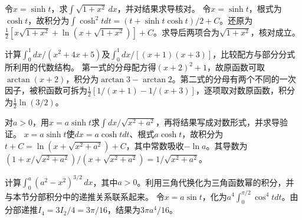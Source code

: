 令\(x=\sinh t\)，求\(\int\sqrt{1+x^2}\,dx\)，并对结果求导核对。
\solutionanswer
令\(x=\sinh t\)，根式为\(\cosh t\)，故积分为\(\int\cosh^2t dt=(t+\sinh t\cosh t)/2+C\)。还原为\(\frac12[x\sqrt{1+x^2}+\ln(x+\sqrt{1+x^2})]+C\)。求导后两项合为\(\sqrt{1+x^2}\)，核对成立。


计算\(\int_0^1dx/(x^2+4x+5)\)及\(\int_0^1dx/[(x+1)(x+3)]\)，比较配方与部分分式所利用的代数结构。
\solutionanswer
第一式的分母配方得\((x+2)^2+1\)，故原函数可取\(\arctan(x+2)\)，积分为\(\arctan3-\arctan2\)。第二式的分母有两个不同的一次因子，被积函数可拆为\(\frac12[1/(x+1)-1/(x+3)]\)，逐项取对数原函数，积分为\(\frac12\ln(3/2)\)。


对\(a>0\)，用\(x=a\sinh t\)求\(\int dx/\sqrt{x^2+a^2}\)，再将结果写成对数形式，并求导验证。
\solutionanswer
\(x=a\sinh t\)使\(dx=a\cosh tdt\)、根式\(a\cosh t\)，故积分为\(t+C=\ln(x+\sqrt{x^2+a^2})+C\)，其中常数吸收\(-\ln a\)。其导数为\((1+x/\sqrt{x^2+a^2})/(x+\sqrt{x^2+a^2})=1/\sqrt{x^2+a^2}\)。


计算\(\int_0^a(a^2-x^2)^{3/2}\,dx\)，其中\(a>0\)。利用三角代换化为三角函数幂的积分，并与本节分部积分中的递推关系联系起来。
\solutionanswer
令\(x=a\sin t\)，化为\(a^4\int_0^{\pi/2}\cos^4t dt\)。由分部递推\(I_4=3I_2/4=3\pi/16\)，结果为\(3\pi a^4/16\)。
\par

